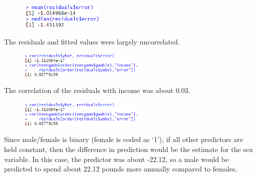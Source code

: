 \documentclass[12pt, letterpaper]{article}
\theoremstyle{definition}
\numberwithin{equation}{section}
\newcommand{\+}[1]{+_{\scalebox{.375}{#1}}}
\newcommand{\1}{\mathbbm{1}}
\begin{document}
\begin{figure}[H]
	\centering
	\includegraphics[width=4cm]{Gambling Mean Residual}
\end{figure}

\vspace{\baselineskip}
\noindent\textbf{}
\vspace{\baselineskip}

The residuals and fitted values were largely uncorrelated.

\begin{figure}[H]
	\centering
	\includegraphics[width=6cm]{Gambling Correlation}
\end{figure}



\vspace{\baselineskip}
\noindent\textbf{}
\vspace{\baselineskip}

The correlation of the residuals with income was about 0.03.

\begin{figure}[H]
	\centering
	\includegraphics[width=6cm]{Gambling Correlation}
\end{figure}


\vspace{\baselineskip}
\noindent\textbf{}
\vspace{\baselineskip}

Since male/female is binary (female is coded as `1'), if all other predictors are held constant, then the difference in prediction would be the estimate for the sex variable. In this case, the predictor was about -22.12, so a male would be predicted to spend about 22.12 pounds more annually compared to females.
\end{document}
